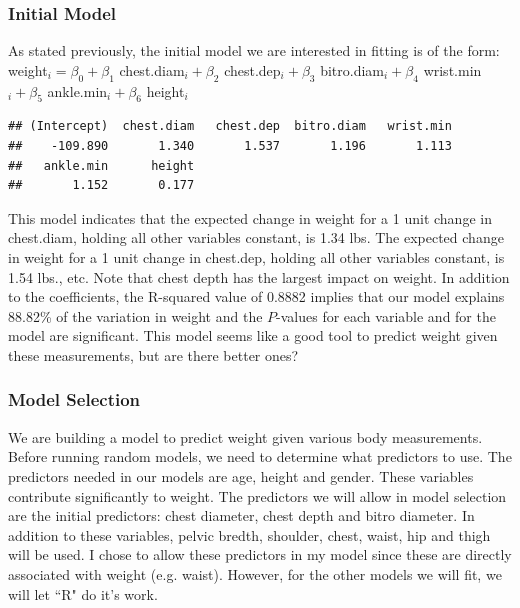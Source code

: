 \documentclass[11pt]{article}\usepackage[]{graphicx}\usepackage[]{color}
\makeatletter
\newenvironment{kframe}{%
 \def\at@end@of@kframe{}%
 \ifinner\ifhmode%
  \def\at@end@of@kframe{\end{minipage}}%
  \begin{minipage}{\columnwidth}%
 \fi\fi%
 \def\FrameCommand##1{\hskip\@totalleftmargin \hskip-\fboxsep
 \colorbox{shadecolor}{##1}\hskip-\fboxsep
     \hskip-\linewidth \hskip-\@totalleftmargin \hskip\columnwidth}%
 \MakeFramed {\advance\hsize-\width
   \@totalleftmargin\z@ \linewidth\hsize
   \@setminipage}}%
 {\par\unskip\endMakeFramed%
 \at@end@of@kframe}
\newenvironment{knitrout}{}{} %
\makeatother
\begin{document}
\subsubsection{Initial Model}

As stated previously, the initial model we are interested in fitting is of the form:\\
weight$_i = \beta_0 + \beta_1$ chest.diam$_{i} + \beta_2$ chest.dep$_{i} + \beta_3$ bitro.diam$_{i} + \beta_4$ wrist.min$_{i} + \beta_5$ ankle.min$_{i} + \beta_6$ height$_{i}$




\begin{knitrout}
\color{fgcolor}\begin{kframe}
\begin{verbatim}
## (Intercept)  chest.diam   chest.dep  bitro.diam   wrist.min 
##    -109.890       1.340       1.537       1.196       1.113 
##   ankle.min      height 
##       1.152       0.177
\end{verbatim}
\end{kframe}
\end{knitrout}


This model indicates that the expected change in weight for a 1 unit change in chest.diam, holding all other variables constant, is 1.34 lbs. The expected change in weight for a 1 unit change in chest.dep, holding all other variables constant, is 1.54 lbs., etc. Note that chest depth has the largest impact on weight. In addition to the coefficients, the R-squared value of 0.8882 implies that our model explains 88.82\% of the variation in weight and the $P$-values for each variable and for the model are significant. This model seems like a good tool to predict weight given these measurements, but are there better ones?

\subsubsection{Model Selection}

We are building a model to predict weight given various body measurements. Before running random models, we need to determine what predictors to use. The predictors needed in our models are age, height and gender. These variables contribute significantly to weight. The predictors we will allow in model selection are the initial predictors: chest diameter, chest depth and bitro diameter. In addition to these variables, pelvic bredth, shoulder, chest, waist, hip and thigh will be used. I chose to allow these predictors in my model since these are directly associated with weight (e.g. waist). However, for the other models we will fit, we will let ``R" do it's work.
\end{document}

